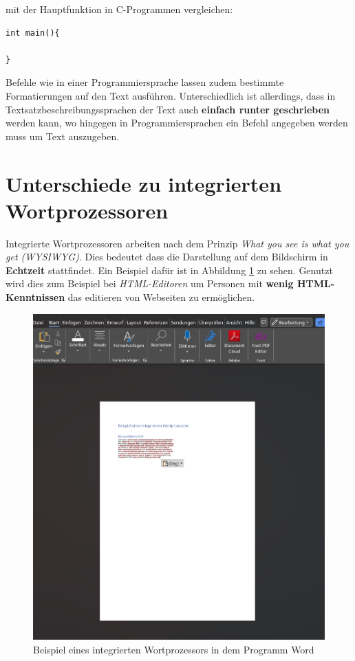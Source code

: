 mit der Hauptfunktion in C-Programmen vergleichen:

\begin{lstlisting}
int main(){

} 
\end{lstlisting}
Befehle wie in einer Programmiersprache lassen zudem bestimmte Formatierungen auf den Text ausführen.
Unterschiedlich ist allerdings, dass in Textsatzbeschreibungssprachen der Text auch \textbf{einfach runter geschrieben} werden kann, wo hingegen in Programmiersprachen ein Befehl angegeben werden muss um Text auszugeben.

\section{Unterschiede zu integrierten Wortprozessoren}
Integrierte Wortprozessoren arbeiten nach dem Prinzip \textit{What you see is what you get (WYSIWYG)}\cite{wysiwyg:2023}.
Dies bedeutet dass die Darstellung auf dem Bildschirm in \textbf{Echtzeit} stattfindet.
Ein Beispiel dafür ist in Abbildung \ref{Wortprozessor} zu sehen.
Genutzt wird dies zum Beispiel bei \textit{HTML-Editoren} um Personen mit \textbf{wenig HTML-Kenntnissen} das editieren von Webseiten zu ermöglichen.

\begin{figure}[h]
	\centering
	\includegraphics[scale=0.5]{Images/Wortprozessor.png}
	\caption{Beispiel eines integrierten Wortprozessors in dem Programm Word}
	\label{Wortprozessor}
\end{figure}

